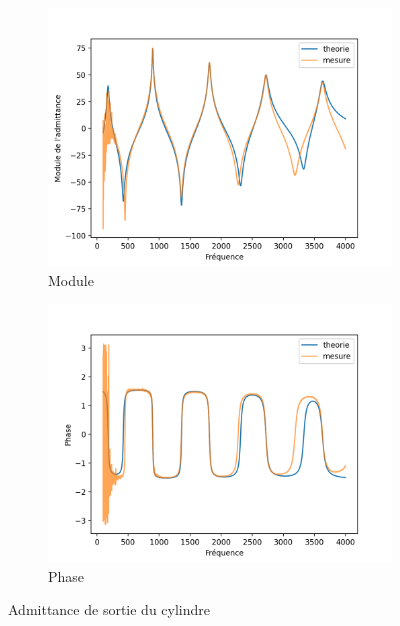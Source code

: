 \documentclass[atiam, article]{rapport} %
\begin{document}
\begin{figure}[H]
  \centering
  \begin{subfigure}[b]{.45\textwidth}
    \centering
    \includegraphics[width=\textwidth]{vents/images_vents/admittance_cylindre_amp.png}
    \caption{Module}
    \label{subfig:admittance_cylindre_amp}
  \end{subfigure}
  \begin{subfigure}[b]{.45\textwidth}
    \centering
    \includegraphics[width=\textwidth]{vents/images_vents/admittance_cylindre_phase.png}
    \caption{Phase}
    \label{subfig:admittance_cylindre_phase}
  \end{subfigure}
  \caption{Admittance de sortie du cylindre}
  \label{fig:admittance}
\end{figure}
\end{document}
